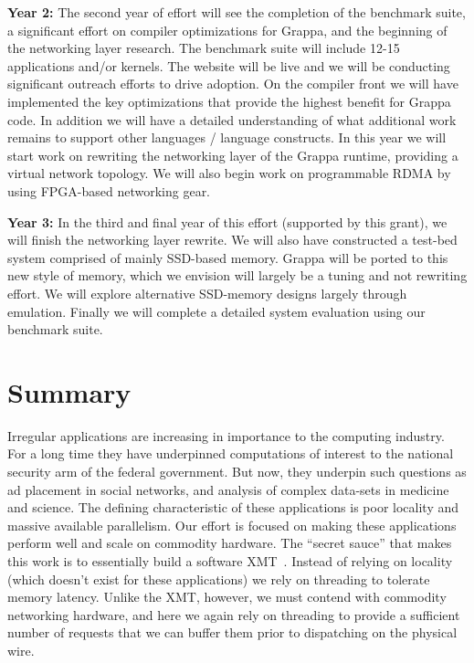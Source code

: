 \vspace{1ex}
\noindent\textbf{Year 2:} The second year of effort will see the completion of the benchmark suite, a significant effort on compiler optimizations for Grappa, and the beginning of the networking layer research.  The benchmark suite will include 12-15 applications and/or kernels.  The website will be live and we will be conducting significant outreach efforts to drive adoption.  On the compiler front we will have implemented the key optimizations that provide the highest benefit for Grappa code.  In addition we will have a detailed understanding of what additional work remains to support other languages / language constructs.  In this year we will start work on rewriting the networking layer of the Grappa runtime, providing a virtual network topology.  We will also begin work on programmable RDMA by using FPGA-based networking gear.


\vspace{1ex}
\noindent\textbf{Year 3:} In the third and final year of this effort (supported by this grant), we will finish the networking layer rewrite.  We will also have constructed a test-bed system comprised of mainly SSD-based memory.  Grappa will be ported to this new style of memory, which we envision will largely be a tuning and not rewriting effort.  We will explore alternative SSD-memory designs largely through emulation.  Finally we will complete a detailed system evaluation using our benchmark suite.

\section{Summary}

Irregular applications are increasing in importance to the computing industry.  For a long time they have underpinned computations of interest to the national security arm of the federal government.  But now, they underpin such questions as ad placement in social networks, and analysis of complex data-sets in medicine and science.  The defining characteristic of these applications is poor locality and massive available parallelism.  Our effort is focused on making these applications perform well and scale on commodity hardware.  The ``secret sauce'' that makes this work is to essentially build a software XMT~\cite{feo:xmt}.  Instead of relying on locality (which doesn't exist for these applications) we rely on threading to tolerate memory latency.  Unlike the XMT, however, we must contend with commodity networking hardware, and here we again rely on threading to provide a sufficient number of requests that we can buffer them prior to dispatching on the physical wire.

